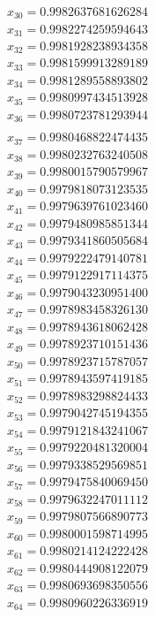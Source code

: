 \begin{multicols}{3}
\begin{align*}
		x_{30} = 0.9982637681626284\\
		x_{31} = 0.9982274259594643\\
		x_{32} = 0.9981928238934358\\
		x_{33} = 0.9981599913289189\\
		x_{34} = 0.9981289558893802\\
		x_{35} = 0.9980997434513928\\
		x_{36} = 0.9980723781293944\\
	\end{align*}
	\vfill
	\columnbreak
	\begin{align*}
		x_{37} = 0.9980468822474435\\
		x_{38} = 0.9980232763240508\\
		x_{39} = 0.9980015790579967\\
		x_{40} = 0.9979818073123535\\
		x_{41} = 0.9979639761023460\\
		x_{42} = 0.9979480985851344\\
		x_{43} = 0.9979341860505684\\
		x_{44} = 0.9979222479140781\\
		x_{45} = 0.9979122917114375\\
		x_{46} = 0.9979043230951400\\
		x_{47} = 0.9978983458326130\\
		x_{48} = 0.9978943618062428\\
		x_{49} = 0.9978923710151436\\
		x_{50} = 0.9978923715787057\\
		x_{51} = 0.9978943597419185\\
		x_{52} = 0.9978983298824433\\
		x_{53} = 0.9979042745194355\\
		x_{54} = 0.9979121843241067\\
		x_{55} = 0.9979220481320004\\
		x_{56} = 0.9979338529569851\\
		x_{57} = 0.9979475840069450\\
		x_{58} = 0.9979632247011112\\
		x_{59} = 0.9979807566890773\\
		x_{60} = 0.9980001598714995\\
		x_{61} = 0.9980214124222428\\
		x_{62} = 0.9980444908122079\\
		x_{63} = 0.9980693698350556\\
		x_{64} = 0.9980960226336919\\

\end{align*}
\end{multicols}
